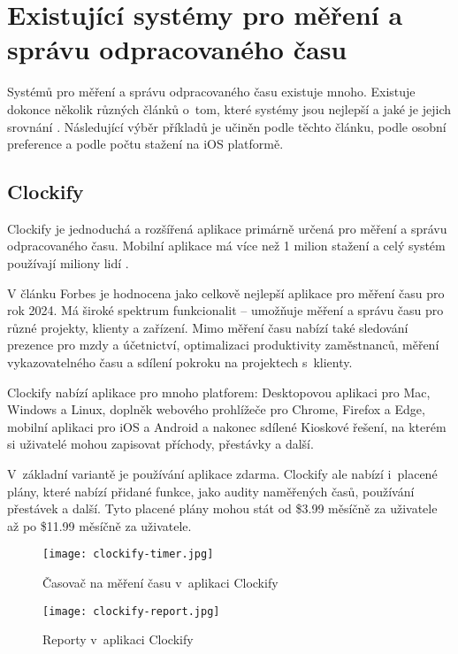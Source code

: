 \section{Existující systémy pro měření a správu odpracovaného času}

Systémů pro měření a správu odpracovaného času existuje mnoho. Existuje dokonce několik různých článků o~tom, které systémy jsou nejlepší a jaké je jejich srovnání \cite{forbes-tracking-apps-article} \cite{zapier-tracking-apps-article}. Následující výběr příkladů je učiněn podle těchto článku, podle osobní preference a podle počtu stažení na iOS platformě.

\subsection{Clockify}

Clockify je jednoduchá a rozšířená aplikace primárně určená pro měření a správu odpracovaného času. Mobilní aplikace má více než 1 milion stažení \cite{clockify-app-magic} a celý systém používají miliony lidí \cite{clockify-customers}. 

V článku Forbes je hodnocena jako celkově nejlepší aplikace pro měření času pro rok 2024. Má široké spektrum funkcionalit – umožňuje měření a správu času pro různé projekty, klienty a zařízení. Mimo měření času nabízí také sledování prezence pro mzdy a účetnictví, optimalizaci produktivity zaměstnanců, měření vykazovatelného času a sdílení pokroku na projektech s~klienty. \cite{forbes-tracking-apps-article}

Clockify nabízí aplikace pro mnoho platforem: Desktopovou aplikaci pro Mac, Windows a Linux, doplněk webového prohlížeče pro Chrome, Firefox a Edge, mobilní aplikaci pro iOS a Android a nakonec sdílené Kioskové řešení, na kterém si uživatelé mohou zapisovat příchody, přestávky a další. \cite{clockify-apps}

V~základní variantě je používání aplikace zdarma. Clockify ale nabízí i~placené plány, které nabízí přidané funkce, jako audity naměřených časů, používání přestávek a další. Tyto placené plány mohou stát od \$3.99 měsíčně za uživatele až po \$11.99 měsíčně za uživatele. \cite{clockify-pricing} 

\begin{figure}[p]
	\centering
	\texttt{[image: clockify-timer.jpg]}
	\caption{Časovač na měření času v~aplikaci Clockify \cite{clockify-features}}
	\label{fig:clockify-timer}
	\vspace{1cm}
	\texttt{[image: clockify-report.jpg]}
	\caption{Reporty v~aplikaci Clockify \cite{clockify-features}}
	\label{fig:clockify-report}
\end{figure}

